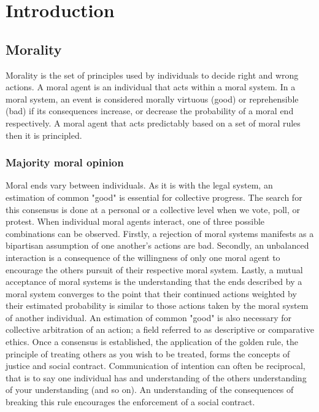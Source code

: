 \chapter{Introduction}
\section{Morality}
Morality is the set of principles used by individuals to decide right and wrong actions.
A moral agent is an individual that acts within a moral system.
In a moral system, an event is considered morally virtuous (good) or reprehensible (bad) if its consequences increase, or decrease the probability of a moral end respectively.
A moral agent that acts predictably based on a set of moral rules then it is principled.

\subsection{Majority moral opinion}
Moral ends vary between individuals.
As it is with the legal system, an estimation of common "good" is essential for collective progress.
The search for this consensus is done at a personal or a collective level when we vote, poll, or protest. 
When individual moral agents interact, one of three possible combinations can be observed.
Firstly, a rejection of moral systems manifests as a bipartisan assumption of one another's actions are bad. 
Secondly, an unbalanced interaction is a consequence of the willingness of only one moral agent to encourage the others pursuit of their respective moral system.
Lastly, a mutual acceptance of moral systems is the understanding that the ends described by a moral system converges to the point that their continued actions weighted by their estimated probability is similar to those actions taken by the moral system of another individual.
An estimation of common "good" is also necessary for collective arbitration of an action; a field referred to as descriptive or comparative ethics.
Once a consensus is established, the application of the golden rule, the principle of treating others as you wish to be treated, forms the concepts of justice and social contract.
Communication of intention can often be reciprocal, that is to say one individual has and understanding of the others understanding of your understanding (and so on).
An understanding of the consequences of breaking this rule encourages the enforcement of a social contract.


